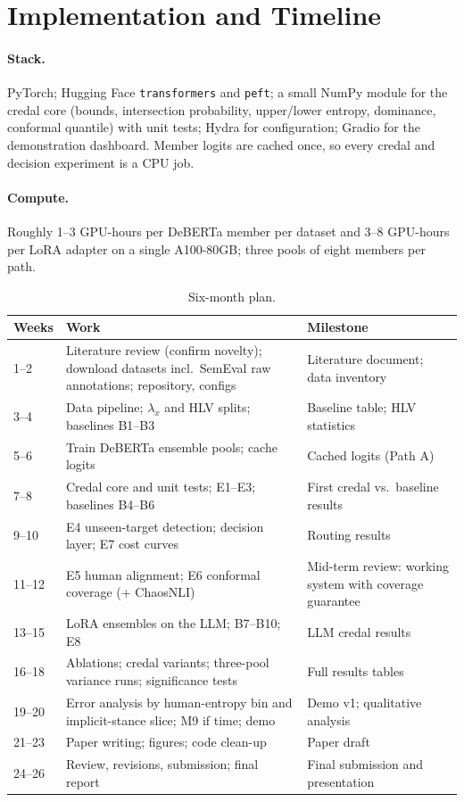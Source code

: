 \documentclass[11pt,a4paper]{article}
\begin{document}
\section{Implementation and Timeline}

\paragraph{Stack.} PyTorch; Hugging Face \texttt{transformers} and \texttt{peft}; a small
NumPy module for the credal core (bounds, intersection probability, upper/lower entropy,
dominance, conformal quantile) with unit tests; Hydra for configuration; Gradio for the
demonstration dashboard. Member logits are cached once, so every credal and decision
experiment is a CPU job.

\paragraph{Compute.} Roughly 1--3 GPU-hours per DeBERTa member per dataset and 3--8
GPU-hours per LoRA adapter on a single A100-80GB; three pools of eight members per path.

\begin{table}[ht]
\centering
\small
\begin{tabular}{l p{8.5cm} p{4.3cm}}
\toprule
Weeks & Work & Milestone \\
\midrule
1--2 & Literature review (confirm novelty); download datasets incl.\ SemEval raw annotations; repository, configs & Literature document; data inventory \\
3--4 & Data pipeline; $\lambda_x$ and HLV splits; baselines B1--B3 & Baseline table; HLV statistics \\
5--6 & Train DeBERTa ensemble pools; cache logits & Cached logits (Path A) \\
7--8 & Credal core and unit tests; E1--E3; baselines B4--B6 & First credal vs.\ baseline results \\
9--10 & E4 unseen-target detection; decision layer; E7 cost curves & Routing results \\
11--12 & E5 human alignment; E6 conformal coverage (+ ChaosNLI) & Mid-term review: working system with coverage guarantee \\
13--15 & LoRA ensembles on the LLM; B7--B10; E8 & LLM credal results \\
16--18 & Ablations; credal variants; three-pool variance runs; significance tests & Full results tables \\
19--20 & Error analysis by human-entropy bin and implicit-stance slice; M9 if time; demo & Demo v1; qualitative analysis \\
21--23 & Paper writing; figures; code clean-up & Paper draft \\
24--26 & Review, revisions, submission; final report & Final submission and presentation \\
\bottomrule
\end{tabular}
\caption{Six-month plan.}
\end{table}
\end{document}
